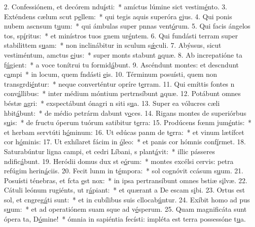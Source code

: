2. Confessiónem, et decórem ndu\uline{í}sti:~* amíctus lúmine sict vestim\uline{é}nto.
3. Exténdens cælum scut p\uline{e}llem:~* qui tegis aquis superóra \uline{e}jus.
4. Qui ponis nubem ascnsum t\uline{u}um:~* qui ámbulas super pnnas vent\uline{ó}rum.
5. Qui facis ángelos tos, sp\uline{í}ritus:~* et minístros tuos gnem ur\uline{é}ntem.
6. Qui fundásti terram super stabilittem s\uline{u}am:~* non inclinábitur in sculum s\uline{ǽ}culi.
7. Abýssus, sicut vestiméntum, amctus \uline{e}jus:~* super monts stabunt \uline{a}quæ.
8. Ab increpatióne ta f\uline{ú}gient:~* a voce tonítrui tu formid\uline{á}bunt.
9. Ascéndunt montes: et descndunt c\uline{a}mpi~* in locum, quem fndásti \uline{e}is.
10. Términum posuísti, quem non transgrdi\uline{é}ntur:~* neque converténtur opríre t\uline{e}rram.
11. Qui emíttis fontes n conv\uline{á}llibus:~* inter médium móntium pertrnsíbunt \uline{a}quæ.
12. Potábunt omnes béstæ \uline{a}gri:~* exspectábunt ónagri n siti s\uline{u}a.
13. Super ea vólucres cæli hbit\uline{á}bunt:~* de médio petrárm dabunt v\uline{o}ces.
14. Rigans montes de superiórbus s\uline{u}is:~* de fructu óperum tuórum satibitur t\uline{e}rra:
15. Prodúcens fœnm jum\uline{é}ntis:~* et herbam servtúti h\uline{ó}minum:
16. Ut edúcas panm de t\uline{e}rra:~* et vinum lætífcet cor h\uline{ó}minis:
17. Ut exhílaret fácim in \uline{ó}leo:~* et panis cor hómnis conf\uline{í}rmet.
18. Saturabúntur ligna campi, et cedri Líbani, s plant\uline{á}vit:~* illic pásseres ndific\uline{á}bunt.
19. Heródii domus dux st e\uline{ó}rum:~* montes excélsi cervis: petra refúgim herin\uline{á}ciis.
20. Fecit lunm in t\uline{é}mpora:~* sol cognóvit ccásum s\uline{u}um.
21. Posuísti ténebras, et fcta \uline{e}st nox:~* in ipsa pertransíbunt omnes bstiæ s\uline{i}lvæ.
22. Cátuli leónum rugiénts, ut r\uline{á}piant:~* et quærant a De escam s\uline{i}bi.
23. Ortus est sol, et cngreg\uline{á}ti sunt:~* et in cubílibus suis cllocab\uline{ú}ntur.
24. Exíbit homo ad pus s\uline{u}um:~* et ad operatiónem suam sque ad v\uline{é}sperum.
25. Quam magnificáta sunt ópera ta, D\uline{ó}mine!~* ómnia in sapiéntia fecísti: impléta est terra possessóne t\uline{u}a.
